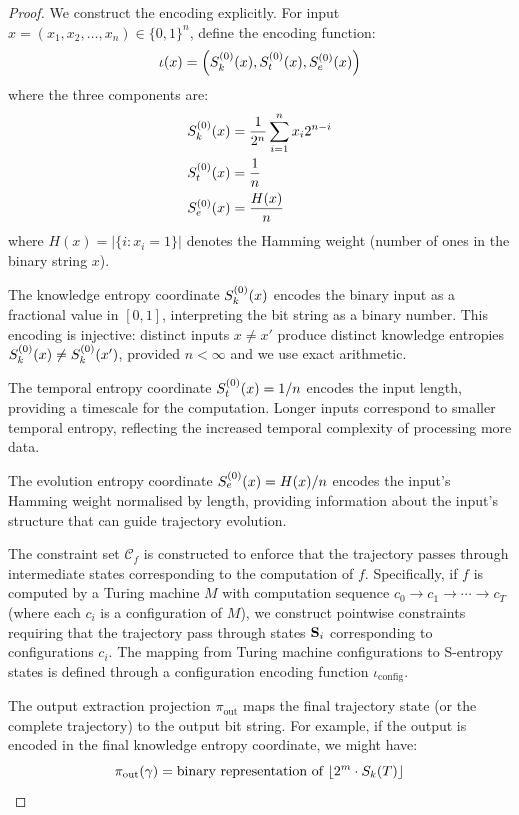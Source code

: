 \begin{proof}
We construct the encoding explicitly. For input $x = (x_1, x_2, \ldots, x_n) \in \{0,1\}^n$, define the encoding function:
\begin{equation}
\iota(x) = \left( S_k^{(0)}(x), S_t^{(0)}(x), S_e^{(0)}(x) \right)
\label{eq:encoding_function}
\end{equation}
where the three components are:
\begin{align}
S_k^{(0)}(x) &= \frac{1}{2^n} \sum_{i=1}^n x_i 2^{n-i} \label{eq:sk_encoding}\\
S_t^{(0)}(x) &= \frac{1}{n} \label{eq:st_encoding}\\
S_e^{(0)}(x) &= \frac{H(x)}{n} \label{eq:se_encoding}
\end{align}
where $H(x) = |\{i : x_i = 1\}|$ denotes the Hamming weight (number of ones in the binary string $x$).

The knowledge entropy coordinate $S_k^{(0)}(x)$ encodes the binary input as a fractional value in $[0,1]$, interpreting the bit string as a binary number. This encoding is injective: distinct inputs $x \neq x'$ produce distinct knowledge entropies $S_k^{(0)}(x) \neq S_k^{(0)}(x')$, provided $n < \infty$ and we use exact arithmetic.

The temporal entropy coordinate $S_t^{(0)}(x) = 1/n$ encodes the input length, providing a timescale for the computation. Longer inputs correspond to smaller temporal entropy, reflecting the increased temporal complexity of processing more data.

The evolution entropy coordinate $S_e^{(0)}(x) = H(x)/n$ encodes the input's Hamming weight normalised by length, providing information about the input's structure that can guide trajectory evolution.

The constraint set $\mathcal{C}_f$ is constructed to enforce that the trajectory passes through intermediate states corresponding to the computation of $f$. Specifically, if $f$ is computed by a Turing machine $M$ with computation sequence $c_0 \to c_1 \to \cdots \to c_T$ (where each $c_i$ is a configuration of $M$), we construct pointwise constraints requiring that the trajectory pass through states $\mathbf{S}_i$ corresponding to configurations $c_i$. The mapping from Turing machine configurations to S-entropy states is defined through a configuration encoding function $\iota_{\text{config}}$.

The output extraction projection $\pi_{\text{out}}$ maps the final trajectory state (or the complete trajectory) to the output bit string. For example, if the output is encoded in the final knowledge entropy coordinate, we might have:
\begin{equation}
\pi_{\text{out}}(\gamma) = \text{binary representation of } \lfloor 2^m \cdot S_k(T) \rfloor
\end{equation}


\end{proof}
